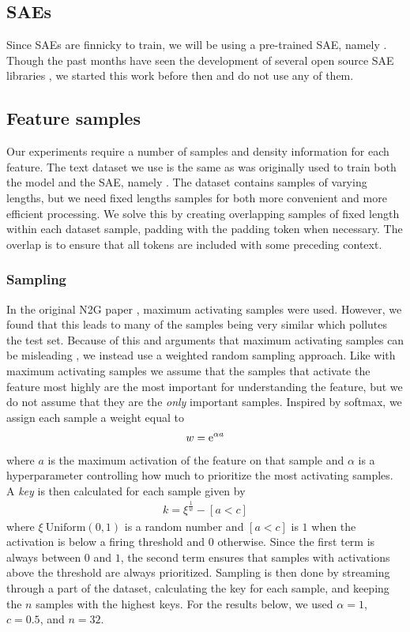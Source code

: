 \documentclass[../main.tex]{subfiles}
\begin{document}

\subsection{SAEs}
Since SAEs are finnicky to train, we will be using a pre-trained SAE, namely .
Though the past months have seen the development of several open source SAE libraries , we started this work before then and do not use any of them.

\subsection{Feature samples}
Our experiments require a number of samples and density information for each feature.
The text dataset we use is the same as was originally used to train both the model and the SAE, namely .
The dataset contains samples of varying lengths, but we need fixed lengths samples for both more convenient and more efficient processing.
We solve this by creating overlapping samples of fixed length within each dataset sample, padding with the padding token when necessary.
The overlap is to ensure that all tokens are included with some preceding context.

\subsubsection{Sampling}
In the original N2G paper , maximum activating samples were used.
However, we found that this leads to many of the samples being very similar which pollutes the test set.
Because of this and arguments that maximum activating samples can be misleading , we instead use a weighted random sampling approach.
Like with maximum activating samples we assume that the samples that activate the feature most highly are the most important for understanding the feature, but we do not assume that they are the \emph{only} important samples.
Inspired by softmax, we assign each sample a weight equal to
\begin{align*}
    w=\mathrm{e}^{\alpha a}
\end{align*}
where $a$ is the maximum activation of the feature on that sample and $\alpha$ is a hyperparameter controlling how much to prioritize the most activating samples.
A \emph{key} is then calculated for each sample given by
\begin{align*}
    k=\xi^{\frac1w}-[a<c]
\end{align*}
where $\xi~\mathrm{Uniform}(0,1)$ is a random number and $[a<c]$ is $1$ when the activation is below a firing threshold and $0$ otherwise.
Since the first term is always between $0$ and $1$, the second term ensures that samples with activations above the threshold are always prioritized.
Sampling is then done by streaming through a part of the dataset, calculating the key for each sample, and keeping the $n$ samples with the highest keys.
For the results below, we used $\alpha=1$, $c=0.5$, and $n=32$.
\end{document}
